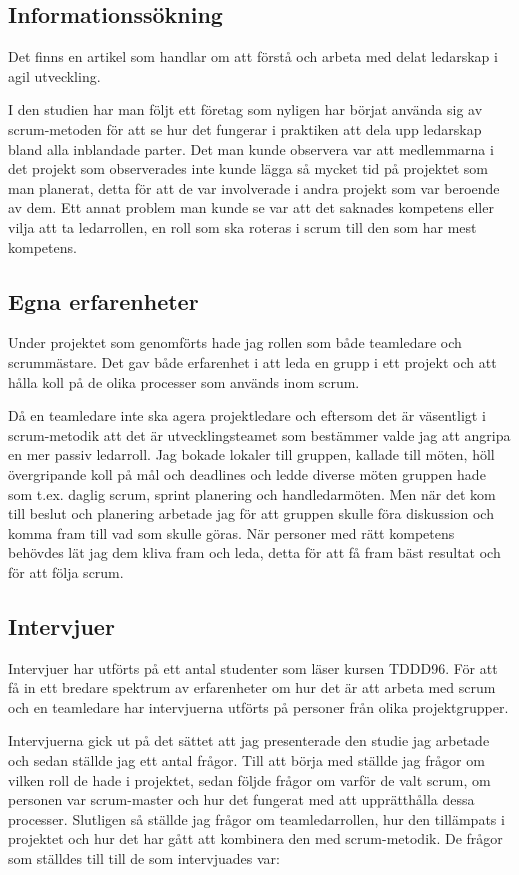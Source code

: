 \subsection{Informationssökning}
Det finns en artikel som handlar om att förstå och arbeta med delat ledarskap i agil utveckling.

I den studien har man följt ett företag som nyligen har börjat använda sig av scrum-metoden för att se hur det fungerar i praktiken att dela upp ledarskap bland alla inblandade parter. Det man kunde observera var att medlemmarna i det projekt som observerades inte kunde lägga så mycket tid på projektet som man planerat, detta för att de var involverade i andra projekt som var beroende av dem. Ett annat problem man kunde se var att det saknades kompetens eller vilja att ta ledarrollen, en roll som ska roteras i scrum till den som har mest kompetens. \cite{sharedleader}

\subsection{Egna erfarenheter}
Under projektet som genomförts hade jag rollen som både teamledare och scrummästare. Det gav både erfarenhet i att leda en grupp i ett projekt och att hålla koll på de olika processer som används inom scrum.

Då en teamledare inte ska agera projektledare och eftersom det är väsentligt i scrum-metodik att det är utvecklingsteamet som bestämmer valde jag att angripa en mer passiv ledarroll. Jag bokade lokaler till gruppen, kallade till möten, höll övergripande koll på mål och deadlines och ledde diverse möten gruppen hade som t.ex. daglig scrum, sprint planering och handledarmöten. Men när det kom till beslut och planering arbetade jag för att gruppen skulle föra diskussion och komma fram till vad som skulle göras. När personer med rätt kompetens behövdes lät jag dem kliva fram och leda, detta för att få fram bäst resultat och för att följa scrum.

\subsection{Intervjuer}
Intervjuer har utförts på ett antal studenter som läser kursen TDDD96. För att få in ett bredare spektrum av erfarenheter om hur det är att arbeta med scrum och en teamledare har intervjuerna utförts på personer från olika projektgrupper.

Intervjuerna gick ut på det sättet att jag presenterade den studie jag arbetade och sedan ställde jag ett antal frågor. Till att börja med ställde jag frågor om vilken roll de hade i projektet, sedan följde frågor om varför de valt scrum, om personen var scrum-master och hur det fungerat med att upprätthålla dessa processer. Slutligen så ställde jag frågor om teamledarrollen, hur den tillämpats i projektet och hur det har gått att kombinera den med scrum-metodik. De frågor som ställdes till till de som intervjuades var:

